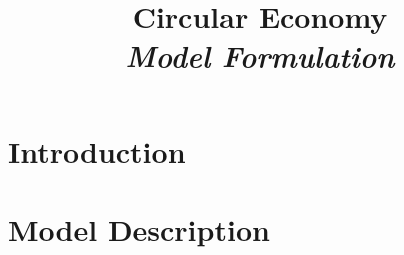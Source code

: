 \documentclass{article}
\begin{document}
\title{Circular Economy\\
\textit{Model Formulation}
}

\maketitle



\section{Introduction}





\section{Model Description}
\end{document}
